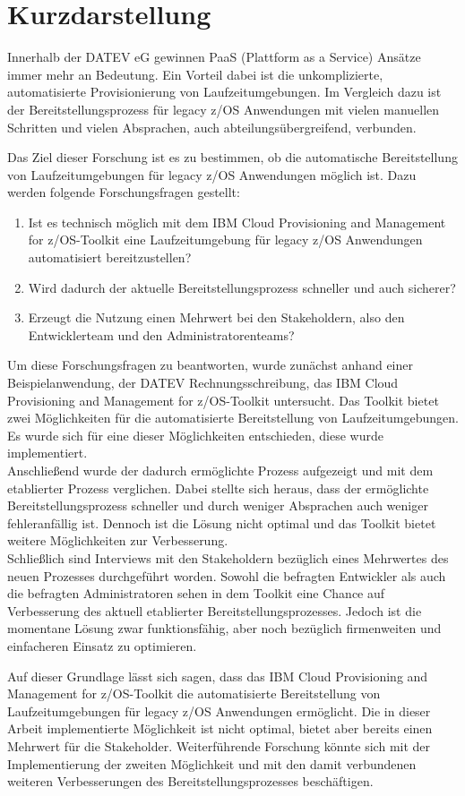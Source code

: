 \thispagestyle{empty}
\section*{Kurzdarstellung}
\label{sec:kurzdarstellung}
Innerhalb der DATEV eG gewinnen PaaS (Plattform as a Service) Ansätze immer mehr an Bedeutung.
Ein Vorteil dabei ist die unkomplizierte, automatisierte Provisionierung von Laufzeitumgebungen.
Im Vergleich dazu ist der Bereitstellungsprozess für legacy z/OS Anwendungen mit vielen manuellen Schritten und vielen Absprachen, auch abteilungsübergreifend, verbunden.

Das Ziel dieser Forschung ist es zu bestimmen, ob die automatische Bereitstellung von Laufzeitumgebungen für legacy z/OS Anwendungen möglich ist.
Dazu werden folgende Forschungsfragen gestellt:
\begin{enumerate}
\item Ist es technisch möglich mit dem \glqq IBM Cloud Provisioning and Management for z/OS\grqq-Toolkit eine Laufzeitumgebung für legacy z/OS Anwendungen automatisiert bereitzustellen?
\item Wird dadurch der aktuelle Bereitstellungsprozess schneller und auch sicherer?
\item Erzeugt die Nutzung einen Mehrwert bei den Stakeholdern, also den Entwicklerteam und den Administratorenteams?
\end{enumerate}
Um diese Forschungsfragen zu beantworten, wurde zunächst anhand einer Beispielanwendung, der DATEV Rechnungsschreibung, das \glqq IBM Cloud Provisioning and Management for z/OS\grqq-Toolkit untersucht.
Das Toolkit bietet zwei Möglichkeiten für die automatisierte Bereitstellung von Laufzeitumgebungen.
Es wurde sich für eine dieser Möglichkeiten entschieden, diese wurde implementiert.\\
Anschließend wurde der dadurch ermöglichte Prozess aufgezeigt und mit dem etablierter Prozess verglichen.
Dabei stellte sich heraus, dass der ermöglichte Bereitstellungsprozess schneller und durch weniger Absprachen auch weniger fehleranfällig ist.
Dennoch ist die Lösung nicht optimal und das Toolkit bietet weitere Möglichkeiten zur Verbesserung.\\
Schließlich sind Interviews mit den Stakeholdern bezüglich eines Mehrwertes des neuen Prozesses durchgeführt worden.
Sowohl die befragten Entwickler als auch die befragten Administratoren sehen in dem Toolkit eine Chance auf Verbesserung des aktuell etablierter Bereitstellungsprozesses.
Jedoch ist die momentane Lösung zwar funktionsfähig, aber noch bezüglich firmenweiten und einfacheren Einsatz zu optimieren.

Auf dieser Grundlage lässt sich sagen, dass das \glqq IBM Cloud Provisioning and Management for z/OS\grqq-Toolkit die automatisierte Bereitstellung von Laufzeitumgebungen für legacy z/OS Anwendungen ermöglicht.
Die in dieser Arbeit implementierte Möglichkeit ist nicht optimal, bietet aber bereits einen Mehrwert für die Stakeholder.
Weiterführende Forschung könnte sich mit der Implementierung der zweiten Möglichkeit und mit den damit verbundenen weiteren Verbesserungen des Bereitstellungsprozesses beschäftigen.



